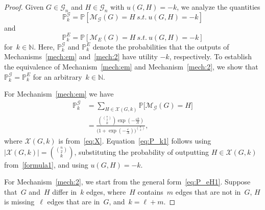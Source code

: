 \documentclass[conference]{ieeeconf}
\newcommand{\G}{\mathcal{G}}
\newcommand{\M}{\mathcal{M}}
\newcommand{\Prob}{\mathbb{P}}
\begin{document}
\begin{proof}    
    Given $G \in \G_n$ and $H \in \G_n$ with ${u(G,H)=-k}$, we analyze the quantities
    \begin{equation}
        \Prob_k^\mathcal{G} = \mathbb{P}[\mathcal{M}_\mathcal{G}(G)=H \ s.t. \ u(G,H)=-k]\label{eq:mech1_initP}
    \end{equation}
    and
    \begin{equation}
        \Prob_k^E = \mathbb{P}[\mathcal{M}_E(G)=H \ s.t. \ u(G,H)=-k] \label{eq:mech2_initP}
    \end{equation}
    for~$k \in \mathbb{N}$. 
    Here, $\Prob_k^\mathcal{G}$ and $\Prob_k^E$ denote the probabilities that the outputs of Mechanisms~\ref{mech:em} and~\ref{mech:2} have utility ${-k}$,  respectively. 
    To establish the equivalence of Mechanism~\ref{mech:em} and Mechanism~\ref{mech:2},
    we show that $\Prob_k^\mathcal{G}=\Prob_k^E$ for an arbitrary~$k \in \mathbb{N}$. 
    
    For Mechanism~\ref{mech:em} we have 
    \begin{align}
        \Prob_k^\mathcal{G}&=\sum_{H\in\mathcal{X}(G,k)}\mathbb{P}\big[\M_{\G}(G) = H\big]\\
        &=\frac{{\binom{\binom{n}{2}}{k}} \exp(-\frac{\varepsilon k}{A})}{\biggl(1+\exp(-\frac{\varepsilon}{A})\biggr)^{\binom{n}{2}}} \label{eq:P_k1},
    \end{align}
    where $\mathcal{X}(G,k)$ is from~\eqref{eq:X}. 
    Equation~\eqref{eq:P_k1} follows using~$|\mathcal{X}(G,k)|=\binom{\binom{n}{2}}{k}$,  
    substituting the probability of outputting $H\in\mathcal{X}(G,k)$ from~\eqref{formula1}, and using $u(G,H) = -k$. 
    
    For Mechanism~\ref{mech:2}, we start from the general form~\eqref{eq:P_eH1}.
    Suppose that~$G$ and~$H$ differ in~$k$ edges, where~$H$ contains~$m$
    edges that are not in~$G$, $H$ is missing~$\ell$ edges that are in~$G$,
    and~$k = \ell + m$. 
    

\end{proof}
\end{document}

